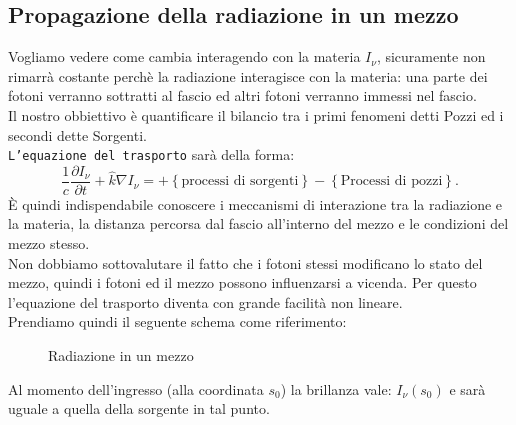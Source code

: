 \subsection{Propagazione della radiazione in un mezzo}%
Vogliamo vedere come cambia interagendo con la materia $I_{\nu}$, sicuramente non rimarrà costante perchè la radiazione interagisce con la materia: una parte dei fotoni verranno sottratti al fascio ed altri fotoni verranno immessi nel fascio. \\
Il nostro obbiettivo è quantificare il bilancio tra i primi fenomeni detti Pozzi ed i secondi dette Sorgenti.\\
\texttt{L'equazione del trasporto} sarà della forma:
\[
	\frac{1}{c}\frac{\partial I_{\nu}}{\partial t} + \hat{k} \nabla I_{\nu} = + \left\{ \text{processi di sorgenti} \right\} - \left\{ \text{Processi di pozzi} \right\} 
.\] 
È quindi indispendabile conoscere i meccanismi di interazione tra la radiazione e la materia, la distanza percorsa dal fascio all'interno del mezzo e le condizioni del mezzo stesso.\\
Non dobbiamo sottovalutare il fatto che i fotoni stessi modificano lo stato del mezzo, quindi i fotoni ed il mezzo possono influenzarsi a vicenda. Per questo l'equazione del trasporto diventa con grande facilità non lineare. \\
Prendiamo quindi il seguente schema come riferimento:
\begin{figure}[H]
    \centering
    \caption{Radiazione in un mezzo}
    \label{fig:radiazione-in-un-mezzo}
\end{figure}
\noindent
Al momento dell'ingresso (alla coordinata $s_0$) la brillanza vale: $I_{\nu}\left( s_0 \right)$  e sarà uguale a quella della sorgente in tal punto.
